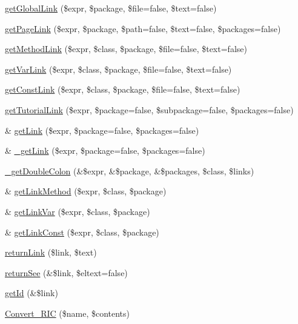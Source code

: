 \begin{DoxyCompactItemize}
\hyperlink{class_converter_afef6bfb2b26aac19e52a1d153d4bae4b}{get\-Global\-Link} (\$expr, \$package, \$file=false, \$text=false)
\item 
\hyperlink{class_converter_a3e4e064d10b9d5a0d44c06828d3a8d0b}{get\-Page\-Link} (\$expr, \$package, \$path=false, \$text=false, \$packages=false)
\item 
\hyperlink{class_converter_a23ab6aa7d92e8ca1cb398a8201d0bd61}{get\-Method\-Link} (\$expr, \$class, \$package, \$file=false, \$text=false)
\item 
\hyperlink{class_converter_a5a0a06a811d1135f4a05c79fb74909db}{get\-Var\-Link} (\$expr, \$class, \$package, \$file=false, \$text=false)
\item 
\hyperlink{class_converter_ad028169d32b0a0293c8bf2fbbff60594}{get\-Const\-Link} (\$expr, \$class, \$package, \$file=false, \$text=false)
\item 
\hyperlink{class_converter_a3f4c1631dd0e31581d389dc53e4c32bb}{get\-Tutorial\-Link} (\$expr, \$package=false, \$subpackage=false, \$packages=false)
\item 
\& \hyperlink{class_converter_a345f04cedd6f4707f74d6858ae318da8}{get\-Link} (\$expr, \$package=false, \$packages=false)
\item 
\& \hyperlink{class_converter_a9d7a6d3fbd6c71c9b8a4845becf5f5f1}{\-\_\-get\-Link} (\$expr, \$package=false, \$packages=false)
\item 
\hyperlink{class_converter_a5441fbe0e3433a3f43462b068cf350b7}{\-\_\-get\-Double\-Colon} (\&\$expr, \&\$package, \&\$packages, \$class, \$links)
\item 
\& \hyperlink{class_converter_a28b75e4d5aa1af42300c0c2ef281e877}{get\-Link\-Method} (\$expr, \$class, \$package)
\item 
\& \hyperlink{class_converter_a43796fd87efa9507a68b204bf8357a0b}{get\-Link\-Var} (\$expr, \$class, \$package)
\item 
\& \hyperlink{class_converter_adaf66c50619ed4743dc88f220ad25df5}{get\-Link\-Const} (\$expr, \$class, \$package)
\item 
\hyperlink{class_converter_af40fcd39ab514ae82e555a451dd72dc2}{return\-Link} (\$link, \$text)
\item 
\hyperlink{class_converter_a615076b85e728c1e2266934112c5d4b3}{return\-See} (\&\$link, \$eltext=false)
\item 
\hyperlink{class_converter_af93bda58fda195d68fd068a6e00a3b47}{get\-Id} (\&\$link)
\item 
\hyperlink{class_converter_ad3f7aa571c77bab78c11f387be1ec587}{\-Convert\-\_\-\-R\-I\-C} (\$name, \$contents)

\end{DoxyCompactItemize}
